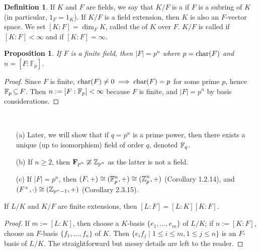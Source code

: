 \documentclass[11pt]{book}
\newcounter{counter}
\newtheorem{proposition}[counter]{Proposition}   \newtheorem{problem}[counter]{Problem}   \newtheorem*{proposition*}{Proposition}   \newtheorem*{lemma*}{Lemma}
\theoremstyle{definition}   \newtheorem{defn}[counter]{Definition} %
\newcommand{\vs}{\vspace{8pt}}   \newcommand{\hs}{\hspace{8pt}}
\numberwithin{counter}{chapter}
\begin{document}
\vs

\begin{defn}
If $K$ and $F$ are fields, we say that $K/F$ is a  if $F$ is a subring of $K$ (in particular, $1_F = 1_K$). If $K/F$ is a field extension, then $K$ is also an $F$-vector space. We set $[K : F] = \dim_F K$, called the  of $K$ over $F$. $K/F$ is called  if $[K : F] < \infty$ and  if $[K : F] = \infty$. 
\end{defn}

\vs

\begin{proposition}
If $F$ is a finite field, then $|F| = p^n$ where $p = \textnormal{char}(F)$ and $n = [F : \mathbb{F}_p]$. 
\end{proposition}

\begin{proof}
Since $F$ is finite, $\textnormal{char}(F) \ne 0 \implies \textnormal{char}(F) = p$ for some prime $p$, hence $\mathbb{F}_p \operatorname{\subseteq} F$. Then $n := [F : \mathbb{F}_p] < \infty$ because $F$ is finite, and $|F| = p^n$ by basis considerations. 
\end{proof}

\vs

\begin{remark}\ 
\begin{enumerate}
\item[(a)] Later, we will show that if $q = p^n$ is a prime power, then there exists a unique (up to isomorphism) field of order $q$, denoted $\mathbb{F}_q$. 
\item[(b)] If $n \geq 2$, then $\mathbf{F}_{p^n} \ncong \operatorname{\mathbb{Z}}_{p^n}$ as the latter is not a field.
\item[(c)] If $|F| = p^n$, then $(F,+) \cong (\mathbb{F}_p^n,+) \cong (\operatorname{\mathbb{Z}}_{p}^n,+)$ (Corollary 1.2.14), and $(F^{\times},\cdot) \cong (\operatorname{\mathbb{Z}}_{p^n-1},+)$ (Corollary 2.3.15). 
\end{enumerate}
\end{remark}

\vs

\begin{lemma}
If $L/K$ and $K/F$ are finite extensions, then $[L : F] = [L : K] [K : F]$.
\end{lemma}

\begin{proof}
If $m := [L : K]$, then choose a $K$-basis $\{e_1,\dots,e_m\}$ of $L/K$; if $n := [K : F]$, choose an $F$-basis $\{f_1,\dots,f_n\}$ of $K$. Then $\{e_i f_j \mid 1 \leq i \leq m, 1 \leq j \leq n\}$ is an $F$-basis of $L/K$. The straightforward but messy details are left to the reader.
\end{proof}
\end{document}
